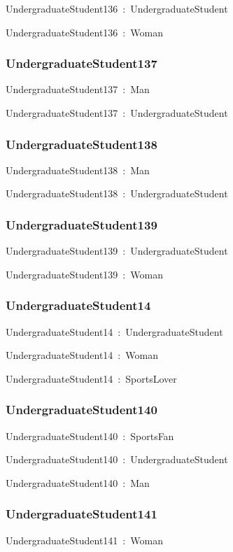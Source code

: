 \documentclass{article}
\begin{document}
UndergraduateStudent136~:~UndergraduateStudent

UndergraduateStudent136~:~Woman

\subsubsection*{UndergraduateStudent137}

UndergraduateStudent137~:~Man

UndergraduateStudent137~:~UndergraduateStudent

\subsubsection*{UndergraduateStudent138}

UndergraduateStudent138~:~Man

UndergraduateStudent138~:~UndergraduateStudent

\subsubsection*{UndergraduateStudent139}

UndergraduateStudent139~:~UndergraduateStudent

UndergraduateStudent139~:~Woman

\subsubsection*{UndergraduateStudent14}

UndergraduateStudent14~:~UndergraduateStudent

UndergraduateStudent14~:~Woman

UndergraduateStudent14~:~SportsLover

\subsubsection*{UndergraduateStudent140}

UndergraduateStudent140~:~SportsFan

UndergraduateStudent140~:~UndergraduateStudent

UndergraduateStudent140~:~Man

\subsubsection*{UndergraduateStudent141}

UndergraduateStudent141~:~Woman
\end{document}
